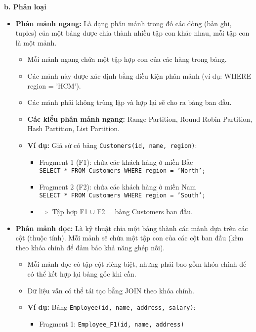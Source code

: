 \documentclass[14pt]{extarticle}
\begin{document}
\textbf{b. Phân loại}
\begin{itemize}
    \item \textbf{Phân mảnh ngang:} Là dạng phân mảnh trong đó các dòng (bản ghi, tuples) của một bảng được chia thành nhiều tập con khác nhau, mỗi tập con là một mảnh.
    \begin{itemize}
        \item Mỗi mảnh ngang chứa một tập hợp con của các hàng trong bảng.
        \item Các mảnh này được xác định bằng điều kiện phân mảnh (ví dụ: WHERE region = 'HCM').
        \item Các mảnh phải không trùng lặp và hợp lại sẽ cho ra bảng ban đầu.
        \item \textbf{Các kiểu phân mảnh ngang:} Range Partition, Round Robin Partition, Hash Partition, List Partition.
        \item \textbf{Ví dụ:} Giả sử có bảng \texttt{Customers(id, name, region)}:
        \begin{itemize}
            \item Fragment 1 (F1): chứa các khách hàng ở miền Bắc\\
            \texttt{SELECT * FROM Customers WHERE region = 'North';}
            \item Fragment 2 (F2): chứa các khách hàng ở miền Nam\\
            \texttt{SELECT * FROM Customers WHERE region = 'South';}
            \item $\Rightarrow$ Tập hợp F1 $\cup$ F2 = bảng Customers ban đầu.
        \end{itemize}
    \end{itemize}
    \item \textbf{Phân mảnh dọc:} Là kỹ thuật chia một bảng thành các mảnh dựa trên các cột (thuộc tính). Mỗi mảnh sẽ chứa một tập con của các cột ban đầu (kèm theo khóa chính để đảm bảo khả năng ghép nối).
    \begin{itemize}
        \item Mỗi mảnh dọc có tập cột riêng biệt, nhưng phải bao gồm khóa chính để có thể kết hợp lại bảng gốc khi cần.
        \item Dữ liệu vẫn có thể tái tạo bằng JOIN theo khóa chính.
        \item \textbf{Ví dụ:} Bảng \texttt{Employee(id, name, address, salary)}:
        \begin{itemize}
            \item Fragment 1: \texttt{Employee\_F1(id, name, address)}

\end{itemize}
\end{itemize}
\end{itemize}
\end{document}
